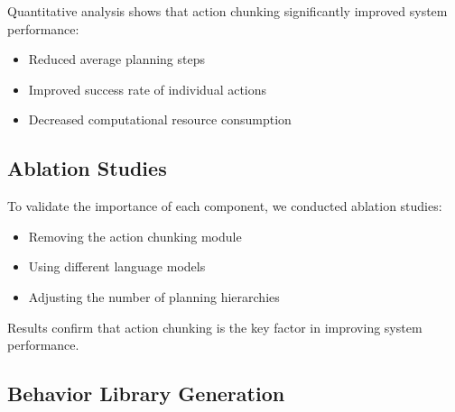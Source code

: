 \documentclass{article}
\begin{document}
Quantitative analysis shows that action chunking significantly improved system performance:

\begin{itemize}
    \item Reduced average planning steps
    \item Improved success rate of individual actions
    \item Decreased computational resource consumption
\end{itemize}

\subsection{Ablation Studies}

To validate the importance of each component, we conducted ablation studies:

\begin{itemize}
    \item Removing the action chunking module
    \item Using different language models
    \item Adjusting the number of planning hierarchies
\end{itemize}

Results confirm that action chunking is the key factor in improving system performance.


\subsection{Behavior Library Generation}
\end{document}
